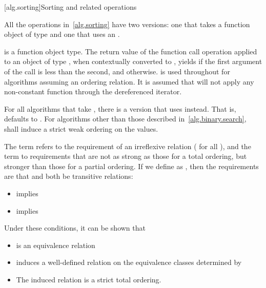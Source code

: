 [alg.sorting]{Sorting and related operations}

\pnum
All the operations in~\ref{alg.sorting} 
have two versions: one that takes a function object of type
and one that uses an
.

\pnum
{}
is a function object
type. The return value of the function call operation applied to
an object of type , when contextually converted to
,
yields  if the first argument of the call
is less than the second, and
otherwise.
is used throughout for algorithms assuming an ordering relation.
It is assumed that
will not apply any non-constant function through the dereferenced iterator.

\pnum
For all algorithms that take
,
there is a version that uses
instead.
That is,
defaults to
.
For algorithms other than those described in~\ref{alg.binary.search},
 shall induce a strict weak ordering on the values.


\pnum
The term
refers to the
requirement of an irreflexive relation ( for all ),
and the term
to requirements that are not as strong as
those for a total ordering,
but stronger than those for a partial
ordering.
If we define
as
,
then the requirements are that
and
both be transitive  relations:

\begin{itemize}
\item
{}
implies
\item
{}
implies
\end{itemize}
\begin{note}
Under these conditions, it can be shown that
\begin{itemize}
\item
{}
is an equivalence relation
\item
{}
induces a well-defined relation on the equivalence
classes determined by
\item
The induced relation is a strict total ordering.
\end{itemize}
\end{note}

